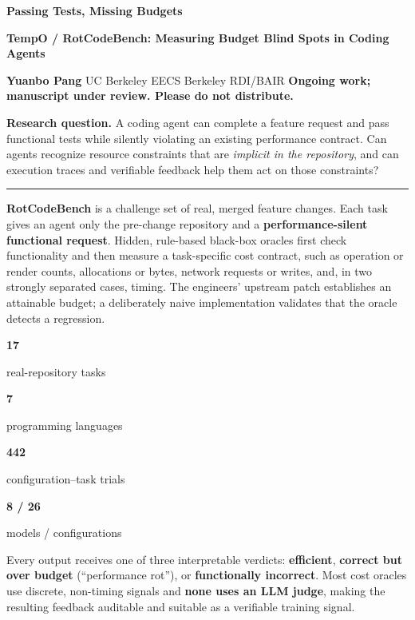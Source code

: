 \documentclass[10pt]{article}
\newcommand{\sectionhead}[1]{%
  \vspace{3pt}{\color{blue}\large\bfseries #1}\par
  {\color{line}\rule{\linewidth}{0.7pt}}\vspace{1pt}
}
\newcommand{\metric}[2]{%
  \begin{minipage}[t]{0.235\linewidth}
    \centering
    {\color{navy}\fontsize{18}{19}\selectfont\bfseries #1}\par
    \vspace{1pt}
    {\color{muted}\scriptsize #2}
  \end{minipage}
}
\begin{document}
\color{ink}

{\color{navy}\fontsize{21}{23}\selectfont\bfseries
Passing Tests, Missing Budgets}\par
\vspace{1pt}
{\color{blue}\large\bfseries
TempO / RotCodeBench: Measuring Budget Blind Spots in Coding Agents}\par
\vspace{3pt}
{\small
\textbf{Yuanbo Pang} \enspace\textbar\enspace UC Berkeley EECS
\enspace\textbar\enspace Berkeley RDI/BAIR
\hfill
{\color{orange}\textbf{Ongoing work; manuscript under review. Please do not distribute.}}}

\vspace{5pt}
\colorbox{light}{%
  \begin{minipage}{0.982\linewidth}
  \vspace{4pt}
  \textbf{\color{navy}Research question.}
  A coding agent can complete a feature request and pass functional tests while
  silently violating an existing performance contract. Can agents recognize
  resource constraints that are \emph{implicit in the repository}, and can
  execution traces and verifiable feedback help them act on those constraints?
  \vspace{4pt}
  \end{minipage}
}

\sectionhead{Benchmark and Evaluation}
\textbf{RotCodeBench} is a challenge set of real, merged feature changes. Each
task gives an agent only the pre-change repository and a
\textbf{performance-silent functional request}. Hidden, rule-based black-box
oracles first check functionality and then measure a task-specific cost
contract, such as operation or render counts, allocations or bytes, network
requests or writes, and, in two strongly separated cases, timing. The
engineers' upstream patch establishes an attainable budget; a deliberately
naive implementation validates that the oracle detects a regression.

\vspace{3pt}
\begin{center}
\metric{17}{real-repository tasks}\hfill
\metric{7}{programming languages}\hfill
\metric{442}{configuration--task trials}\hfill
\metric{8 / 26}{models / configurations}
\end{center}
\vspace{-2pt}

Every output receives one of three interpretable verdicts:
\textbf{\color{blue}efficient},
\textbf{\color{orange}correct but over budget} (``performance rot''), or
\textbf{functionally incorrect}. Most cost oracles use discrete, non-timing
signals and \textbf{none uses an LLM judge}, making the resulting feedback
auditable and suitable as a verifiable training signal.
\end{document}
